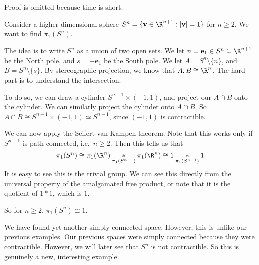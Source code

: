 \documentclass[a4paper]{article}
\begin{document}
Proof is omitted because time is short. %

\begin{eg}
  Consider a higher-dimensional sphere $S^n = \{\mathbf{v} \in \R^{n + 1}: |\mathbf{v}| = 1\}$ for $n \geq 2$. We want to find $\pi_1(S^n)$.

  The idea is to write $S^n$ as a union of two open sets. We let $n = \mathbf{e}_1 \in S^n \subseteq \R^{n + 1}$ be the North pole, and $s = -\mathbf{e}_1$ be the South pole. We let $A = S^n \setminus \{n\}$, and $B = S^n \setminus\{s\}$. By stereographic projection, we know that $A, B \cong \R^n$. The hard part is to understand the intersection.

  To do so, we can draw a cylinder $S^{n - 1} \times (-1, 1)$, and project our $A\cap B$ onto the cylinder. We can similarly project the cylinder onto $A\cap B$. So $A\cap B\cong S^{n - 1} \times (-1, 1) \simeq S^{n - 1}$, since $(-1, 1)$ is contractible.
  \begin{center}
  \end{center}
  We can now apply the Seifert-van Kampen theorem. Note that this works only if $S^{n - 1}$ is path-connected, i.e.\ $n \geq 2$. Then this tells us that
  \[
    \pi_1(S^n) \cong \pi_1(\R^n) \underset{\pi_1(S^{n - 1})}{*} \pi_1(\R^n) \cong 1 \underset{\pi_1(S^{n - 1})}{*} 1
  \]
It is easy to see this is the trivial group. We can see this directly from the universal property of the amalgamated free product, or note that it is the quotient of $1 * 1$, which is $1$.

  So for $n \geq 2$, $\pi_1(S^n) \cong 1$.
\end{eg}
We have found yet another simply connected space. However, this is unlike our previous examples. Our previous spaces were simply connected because they were contractible. However, we will later see that $S^n$ is not contractible. So this is genuinely a new, interesting example.
\end{document}
